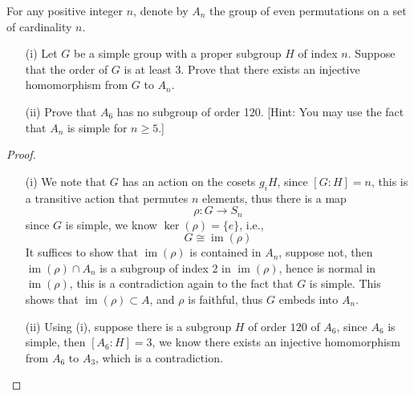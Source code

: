 \documentclass[openany]{book}
\DeclareMathOperator{\im}{im}
\begin{document}
\begin{prob}
    For any positive integer \( n \), denote by \( A_n \) the group of even permutations on a set of cardinality \( n \).

    \begin{enumerate}
        \item[(i)] Let \( G \) be a simple group with a proper subgroup \( H \) of index \( n \). Suppose that the order of \( G \) is at least 3. Prove that there exists an injective homomorphism from \( G \) to \( A_n \).
        
        \item[(ii)] Prove that \( A_6 \) has no subgroup of order 120. [Hint: You may use the fact that \( A_n \) is simple for \( n \geq 5 \).]
    \end{enumerate}
\end{prob}
\begin{proof}
    \begin{itemize}
        \item[(i)] We note that $G$ has an action on the cosets $g_iH$, since $[G:H]=n$, this is a transitive action that permutes $n$ elements, thus there is a map 
        \begin{equation*}
            \rho: G\to S_n
        \end{equation*}
        since $G$ is simple, we know $\ker(\rho)=\{e\}$, i.e., 
        \begin{equation*}
            G\cong\im(\rho)
        \end{equation*}
        It suffices to show that $\im(\rho)$ is contained in $A_n$, suppose not, then $\im(\rho)\cap A_n$ is a subgroup of index $2$ in $\im(\rho)$, hence is normal in $\im(\rho)$, this is a contradiction again to the fact that $G$ is simple. This shows that $\im(\rho)\subset A$, and $\rho$ is faithful, thus $G$ embeds into $A_n$.
        \item[(ii)] Using (i), suppose there is a subgroup $H$ of order $120$ of $A_6$, since $A_6$ is simple, then $[A_6: H]=3$, we know there exists an injective homomorphism from $A_6$ to $A_3$, which is a contradiction.
    \end{itemize}
\end{proof}
\end{document}
